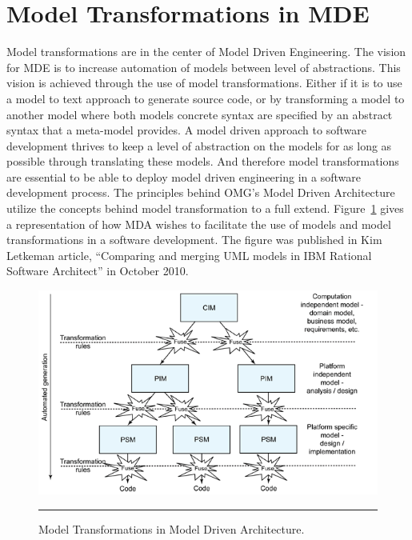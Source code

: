 \section{Model Transformations in MDE}

Model transformations are in the center of Model Driven Engineering.
The vision for MDE is to increase automation of models between level of
abstractions. This vision is achieved through the use of model transformations.
Either if it is to use a model to text approach to generate source code, or by
transforming a model to another model where both models concrete syntax are
specified by an abstract syntax that a meta-model provides. A model driven
approach to software development thrives to keep a level of abstraction on the models for
as long as possible through translating these models. And therefore model
transformations are essential to be able to deploy model driven engineering in a
software development process. The principles behind OMG's Model Driven
Architecture utilize the concepts behind model transformation to a full extend. 
Figure~\ref{fig:MDE_MDA_MT} gives a representation of how MDA wishes to
facilitate the use of models and model transformations in a software
development. The figure was published in Kim Letkeman article, ``Comparing and
merging UML models in IBM Rational Software
Architect''\cite{letkeman2005comparing} in October 2010.

\begin{figure}[H]
  \centering
    \includegraphics[scale=0.8]{./Figures/MDA_MDE.png}
    \rule{35em}{0.5pt}
  \caption[Model Transformations in MDA]
  				{Model Transformations in Model Driven Architecture.}
  \label{fig:MDE_MDA_MT}
\end{figure}

